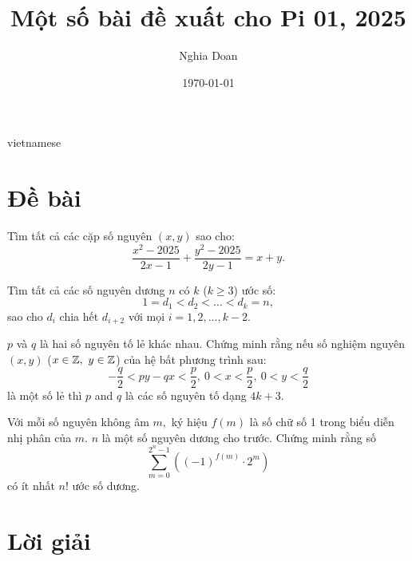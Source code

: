 \documentclass{article}
\title{Một số bài đề xuất cho Pi 01, 2025}
\author{Nghia Doan}
\date{\today}
\begin{document}
\begin{otherlanguage*}{vietnamese}

\maketitle

\section{Đề bài}

\begin{problem*}
    \label{problem:pi-2025-1-p1}
    Tìm tất cả các cặp số nguyên $(x, y)$ sao cho:
    \[
        \frac{x^2 - 2025}{2x - 1} + \frac{y^2 - 2025}{2y - 1} = x + y.
    \]
\end{problem*}

\bigbreak

\begin{problem*}
    \label{problem:pi-2025-1-p2}
    Tìm tất cả các số nguyên dương $n$ có $k$ ($k \ge 3$) ước số: 
    \[ 
        1 = d_1 < d_2 < \ldots < d_k = n,
    \]
    sao cho $d_i$ chia hết $d_{i+2}$ với mọi $i=1,2, \ldots, k-2.$
\end{problem*}

\bigbreak

\begin{problem*}
    \label{problem:pi-2025-1-p3}
    $p$ và $q$ là hai số nguyên tố lẻ khác nhau. Chứng minh rằng nếu số nghiệm nguyên $(x,y)$ ($x \in \mathbb Z,\ y \in \mathbb Z$) của hệ bất phương trình sau:
    \[
        -\frac{q}{2} < py - qx < \frac{p}{2},\ 0 < x < \frac{p}{2},\ 0 < y < \frac{q}{2}
    \]
    là một số lẻ thì $p$ and $q$ là các số nguyên tố dạng $4k+3.$
\end{problem*}

\bigbreak

\begin{problem*}
    \label{problem:pi-2025-1-p3}
    Với mỗi số nguyên không âm $m,$ ký hiệu $f(m)$ là số chữ số 1 trong biểu diễn nhị phân của $m.$ $n$ là một số nguyên dương cho trước.
    Chứng minh rằng số
    \[
        \sum_{m=0}^{2^n - 1} \left( (-1)^{f(m)} \cdot 2^m \right)
    \]
    có ít nhất $n!$ ước số dương.
\end{problem*}

\newpage 

\section{Lời giải}


\end{otherlanguage*}
\end{document}
